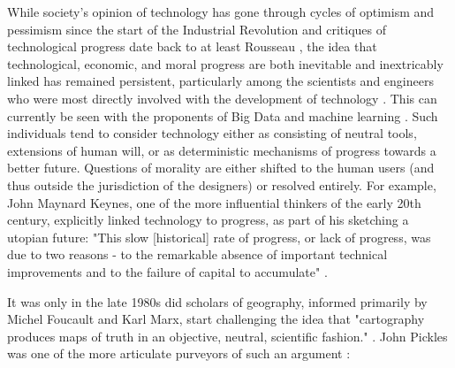 While society's opinion of technology has gone through cycles of optimism and pessimism since the start of the Industrial Revolution and critiques of technological progress date back to at least Rousseau \cite{rousseauDiscourseInequality1755}, the idea that technological, economic, and moral progress are both inevitable and inextricably linked has remained persistent, particularly among the scientists and engineers who were most directly involved with the development of technology \cite{mazlish1963}. This can currently be seen with the proponents of Big Data and machine learning \cite{boydCriticalQuestionsBig2012}. Such individuals tend to consider technology either as consisting of neutral tools, extensions of human will, or as deterministic mechanisms of progress towards a better future. Questions of morality are either shifted to the human users (and thus outside the jurisdiction of the designers) or resolved entirely. For example, John Maynard Keynes, one of the more influential thinkers of the early 20th century, explicitly linked technology to progress, as part of his sketching a utopian future: "This slow [historical] rate of progress, or lack of progress, was due to two reasons - to the remarkable absence of important technical improvements and to the failure of capital to accumulate" \cite{keynesEconomicPossibilitiesOur2010}.

It was only in the late 1980s did scholars of geography, informed primarily by Michel Foucault and Karl Marx, start challenging the idea that "cartography produces maps of truth in an objective, neutral, scientific fashion." \cite{kitchinThinkingMaps2011}. John Pickles was one of the more articulate purveyors of such an argument \cite{picklesGroundTruthSocial1994}:

